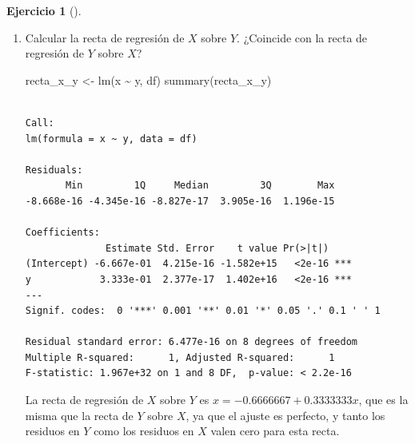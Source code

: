 \documentclass[
  a4paper,
]{scrreport}
\newenvironment{Shaded}{\begin{snugshade}}{\end{snugshade}}
\newcommand{\FunctionTok}[1]{\textcolor[rgb]{0.28,0.35,0.67}{#1}}
\newcommand{\NormalTok}[1]{\textcolor[rgb]{0.00,0.23,0.31}{#1}}
\newcommand{\OtherTok}[1]{\textcolor[rgb]{0.00,0.23,0.31}{#1}}
\newcommand{\SpecialCharTok}[1]{\textcolor[rgb]{0.37,0.37,0.37}{#1}}
\theoremstyle{definition}
\newtheorem{exercise}{Ejercicio}[chapter]
\theoremstyle{remark}
\begin{document}
\begin{exercise}[]
\begin{enumerate}
\begin{tcolorbox}
  \end{tcolorbox}
\item
  Calcular la recta de regresión de \(X\) sobre \(Y\). ¿Coincide con la
  recta de regresión de \(Y\) sobre \(X\)?

  \begin{tcolorbox}[enhanced jigsaw, breakable, toptitle=1mm, colbacktitle=quarto-callout-tip-color!10!white, rightrule=.15mm, opacityback=0, opacitybacktitle=0.6, titlerule=0mm, coltitle=black, colframe=quarto-callout-tip-color-frame, colback=white, bottomtitle=1mm, leftrule=.75mm, toprule=.15mm, title=\textcolor{quarto-callout-tip-color}{\faLightbulb}\hspace{0.5em}{Solución}, arc=.35mm, bottomrule=.15mm, left=2mm]

\begin{Shaded}
\begin{Highlighting}[]
\NormalTok{recta\_x\_y }\OtherTok{\textless{}{-}} \FunctionTok{lm}\NormalTok{(x }\SpecialCharTok{\textasciitilde{}}\NormalTok{ y, df) }
\FunctionTok{summary}\NormalTok{(recta\_x\_y)}
\end{Highlighting}
\end{Shaded}

\begin{verbatim}

Call:
lm(formula = x ~ y, data = df)

Residuals:
       Min         1Q     Median         3Q        Max 
-8.668e-16 -4.345e-16 -8.827e-17  3.905e-16  1.196e-15 

Coefficients:
              Estimate Std. Error    t value Pr(>|t|)    
(Intercept) -6.667e-01  4.215e-16 -1.582e+15   <2e-16 ***
y            3.333e-01  2.377e-17  1.402e+16   <2e-16 ***
---
Signif. codes:  0 '***' 0.001 '**' 0.01 '*' 0.05 '.' 0.1 ' ' 1

Residual standard error: 6.477e-16 on 8 degrees of freedom
Multiple R-squared:      1, Adjusted R-squared:      1 
F-statistic: 1.967e+32 on 1 and 8 DF,  p-value: < 2.2e-16
\end{verbatim}

  La recta de regresión de \(X\) sobre \(Y\) es
  \(x = -0.6666667 + 0.3333333 x\), que es la misma que la recta de
  \(Y\) sobre \(X\), ya que el ajuste es perfecto, y tanto los residuos
  en \(Y\) como los residuos en \(X\) valen cero para esta recta.

  \end{tcolorbox}
\end{enumerate}

\end{exercise}
\end{document}
